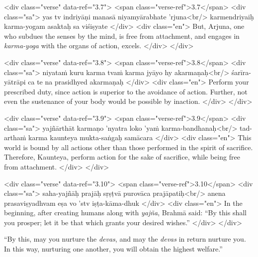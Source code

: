\begin{html}
<div class="verse" data-ref="3.7">
  <span class="verse-ref">3.7</span>
  <div class="sa">
    yas tv indriyāṇi manasā niyamyārabhate ’rjuna<br/>
    karmendriyaiḥ karma-yogam asaktaḥ sa viśiṣyate
  </div>
  <div class="en">
    But, Arjuna, one who subdues the senses by the mind, is free from attachment, and engages in \textit{karma-yoga} with the organs of action, excels.
  </div>
</div>
\end{html}



\begin{html}
<div class="verse" data-ref="3.8">
  <span class="verse-ref">3.8</span>
  <div class="sa">
    niyataṁ kuru karma tvaṁ karma jyāyo hy akarmaṇaḥ<br/>
    śarīra-yātrāpi ca te na prasidhyed akarmaṇaḥ
  </div>
  <div class="en">
    Perform your prescribed duty, since action is superior to the avoidance of action. Further, not even the sustenance of your body would be possible by inaction.
  </div>
</div>
\end{html}



\begin{html}
<div class="verse" data-ref="3.9">
  <span class="verse-ref">3.9</span>
  <div class="sa">
    yajñārthāt karmaṇo ’nyatra loko ’yaṁ karma-bandhanaḥ<br/>
    tad-arthaṁ karma kaunteya mukta-saṅgaḥ samācara
  </div>
  <div class="en">
    This world is bound by all actions other than those performed in the spirit of sacrifice. Therefore, Kaunteya, perform action for the sake of sacrifice, while being free from attachment.
  </div>
</div>
\end{html}



\begin{html}
<div class="verse" data-ref="3.10">
  <span class="verse-ref">3.10</span>
  <div class="sa">
    saha-yajñāḥ prajāḥ sṛṣṭvā purovāca prajāpatiḥ<br/>
    anena prasaviṣyadhvam eṣa vo ’stv iṣṭa-kāma-dhuk
  </div>
  <div class="en">
    In the beginning, after creating humans along with \textit{yajña}, Brahmā said: \enquote{By this shall you prosper; let it be that which grants your desired wishes.}
  </div>
</div>
\end{html}


{\enquote{By this, may you nurture the \textit{devas}, and may the \textit{devas} in return nurture you. In this way, nurturing one another, you will obtain the highest welfare.}}


